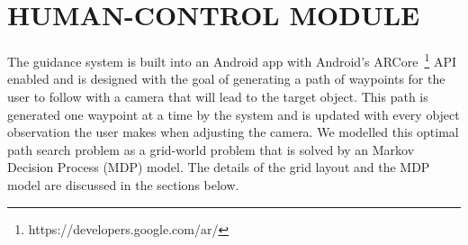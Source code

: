 \documentclass[a4paper, twoside]{article}
\begin{document}
\section{\uppercase{Human-control Module}}\label{sec:controller-design}

\noindent The guidance system is built into an Android app with Android's ARCore~\footnote{https://developers.google.com/ar/} API enabled and is designed with the goal of generating a path of waypoints for the user to follow with a camera that will lead to the target object. This path is generated one waypoint at a time by the system and is updated with every object observation the user makes when adjusting the camera. We modelled this optimal path search problem as a grid-world problem that is solved by an Markov Decision Process (MDP) model. The details of the grid layout and the MDP model are discussed in the sections below. %




\end{document}
